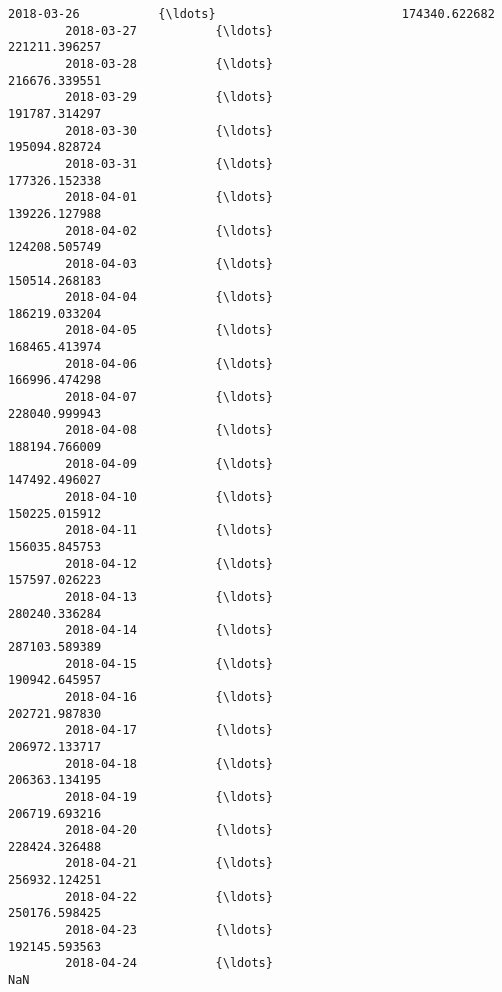 \documentclass[11pt]{article}
\begin{document}
\begin{Verbatim}[commandchars=\\\{\}]
        2018-03-26           {\ldots}                          174340.622682   
        2018-03-27           {\ldots}                          221211.396257   
        2018-03-28           {\ldots}                          216676.339551   
        2018-03-29           {\ldots}                          191787.314297   
        2018-03-30           {\ldots}                          195094.828724   
        2018-03-31           {\ldots}                          177326.152338   
        2018-04-01           {\ldots}                          139226.127988   
        2018-04-02           {\ldots}                          124208.505749   
        2018-04-03           {\ldots}                          150514.268183   
        2018-04-04           {\ldots}                          186219.033204   
        2018-04-05           {\ldots}                          168465.413974   
        2018-04-06           {\ldots}                          166996.474298   
        2018-04-07           {\ldots}                          228040.999943   
        2018-04-08           {\ldots}                          188194.766009   
        2018-04-09           {\ldots}                          147492.496027   
        2018-04-10           {\ldots}                          150225.015912   
        2018-04-11           {\ldots}                          156035.845753   
        2018-04-12           {\ldots}                          157597.026223   
        2018-04-13           {\ldots}                          280240.336284   
        2018-04-14           {\ldots}                          287103.589389   
        2018-04-15           {\ldots}                          190942.645957   
        2018-04-16           {\ldots}                          202721.987830   
        2018-04-17           {\ldots}                          206972.133717   
        2018-04-18           {\ldots}                          206363.134195   
        2018-04-19           {\ldots}                          206719.693216   
        2018-04-20           {\ldots}                          228424.326488   
        2018-04-21           {\ldots}                          256932.124251   
        2018-04-22           {\ldots}                          250176.598425   
        2018-04-23           {\ldots}                          192145.593563   
        2018-04-24           {\ldots}                                    NaN   
        

\end{Verbatim}
\end{document}
